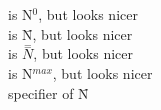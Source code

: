 
 is N$^0$, but looks nicer\\
 is \={N}, but looks nicer\\
 is $\stackrel{=}{N}$, but looks nicer\\
 is N$^{max}$, but looks nicer\\
 specifier of \={N}